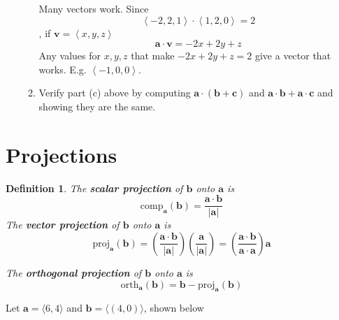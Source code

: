 \documentclass[12pt]{exam}
\newcommand{\gen}[1]{\left\langle #1 \right\rangle}
\newcommand{\ba}{\bm{a}}
\newcommand{\bb}{\bm{b}}
\newcommand{\bc}{\bm{c}}
\newtheorem*{definition}{Definition}
\begin{document}
\begin{enumerate}
\begin{enumerate}
          \begin{solution}
            Many vectors work. Since
            \[
              \gen{-2,2,1}\cdot\gen{1,2,0}=2
            \],
            if \(\bm{v}=\gen{x,y,z}\) 
            \[
              \ba\cdot\bm{v}=-2x+2y+z
            \]
            Any values for \(x,y,z\) that make \(-2x+2y+z=2\) give a vector that works. E.g. \(\gen{-1,0,0}\).
          \end{solution}
        \item Verify part (c) above by computing \(\ba\cdot(\bb+\bc)\) and \(\ba\cdot\bb+\ba\cdot\bc\) and showing they are the same.
    \end{enumerate}
\end{enumerate}


\newpage

\section*{Projections}

\begin{definition}
  The \textbf{scalar projection} of \(\bm{b}\) onto \(\bm{a}\) is
  \[
    \mathrm{comp}_{\ba}(\bb) = \dfrac{\ba\cdot\bb}{|\ba|}
  \]
  The \textbf{vector projection} of \(\bm{b}\) onto \(\bm{a}\) is
  \[
    \mathrm{proj}_{\ba}(\bb) = \left(\dfrac{\ba\cdot\bb}{|\ba|}\right) \left(\dfrac{\ba}{|\ba|}\right) = \left(\dfrac{\ba\cdot\bb}{\ba\cdot\ba}\right)\ba
  \]

  The \textbf{orthogonal projection} of \(\bm{b}\) onto \(\bm{a}\) is
  \[
    \mathrm{orth}_{\ba}(\bb) = \bb-\mathrm{proj}_{\ba}(\bb)
  \]
\end{definition}

Let \(\bm{a}=\langle6,4\rangle\) and \(\bm{b}=\langle(4,0)\rangle\), shown below

\begin{center}
\end{center}
\end{document}
